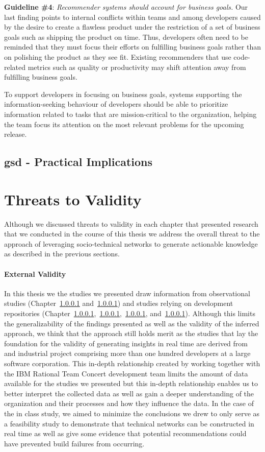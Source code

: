 \textbf{Guideline \#4}: \emph{Recommender systems should account for business goals.}
Our last finding points to internal conflicts within teams and among developers caused by the desire to create a flawless product under the restriction of a set of business goals such as shipping the product on time.
Thus, developers often need to be reminded that they must focus their efforts on fulfilling business goals rather than on polishing the product as they see fit. Existing recommenders that use code-related metrics such as quality or productivity may shift attention away from fulfilling business goals.

To support developers in focusing on business goals, systems supporting the information-seeking behaviour of developers should be able to prioritize information related to tasks that are mission-critical to the organization, helping the team focus its attention on the most relevant problems for the upcoming release.


\subsection{gsd - Practical Implications}



\section{Threats to Validity}
Although we discussed threats to validity in each chapter that presented research that we conducted in the course of this thesis we  address the overall threat to the approach of leveraging socio-technical networks to generate actionable knowledge as described in the previous sections.

\paragraph{External Validity}
In this thesis we the studies we presented draw information from observational studies (Chapter~\ref{} and~\ref{}) and studies relying on development repositories (Chapter~\ref{},~\ref{},~\ref{}, and~\ref{}).
Although this limits the generalizability of the findings presented as well as the validity of the inferred approach, we think that the approach still holds merit as the studies that lay the foundation for the validity of generating insights in real time are derived from and industrial project comprising more than one hundred developers at a large software corporation.
This in-depth relationship created by working together with the IBM Rational Team Concert development team limits the amount of data available for the studies we presented but this in-depth relationship enables us to better interpret the collected data as well as gain a deeper understanding of the organization and their processes and how they influence the data.
In the case of the in class study, we aimed to minimize the conclusions we drew to only serve as a feasibility study to demonstrate that technical networks can be constructed in real time as well as give some evidence that potential recommendations could have prevented build failures from occurring.

